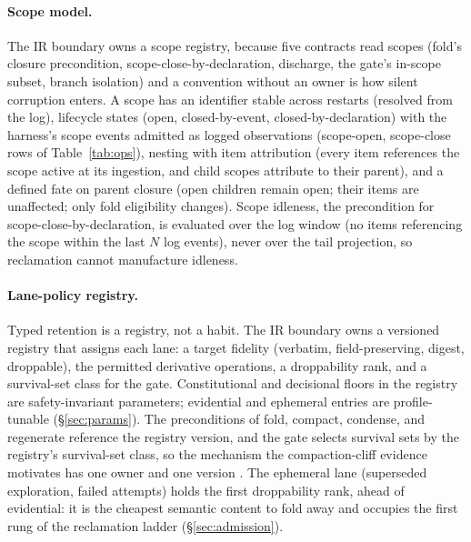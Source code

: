 \documentclass[11pt]{article}
\begin{document}
\paragraph{Scope model.} The IR boundary owns a scope registry, because five contracts read scopes (fold's closure precondition, scope-close-by-declaration, discharge, the gate's in-scope subset, branch isolation) and a convention without an owner is how silent corruption enters. A scope has an identifier stable across restarts (resolved from the log), lifecycle states (open, closed-by-event, closed-by-declaration) with the harness's scope events admitted as logged observations (scope-open, scope-close rows of Table~\ref{tab:ops}), nesting with item attribution (every item references the scope active at its ingestion, and child scopes attribute to their parent), and a defined fate on parent closure (open children remain open; their items are unaffected; only fold eligibility changes). Scope idleness, the precondition for scope-close-by-declaration, is evaluated over the log window (no items referencing the scope within the last $N$ log events), never over the tail projection, so reclamation cannot manufacture idleness.

\paragraph{Lane-policy registry.}
\label{sec:lanepolicy}
Typed retention is a registry, not a habit. The IR boundary owns a versioned registry that assigns each lane: a target fidelity (verbatim, field-preserving, digest, droppable), the permitted derivative operations, a droppability rank, and a survival-set class for the gate. Constitutional and decisional floors in the registry are safety-invariant parameters; evidential and ephemeral entries are profile-tunable (\S\ref{sec:params}). The preconditions of fold, compact, condense, and regenerate reference the registry version, and the gate selects survival sets by the registry's survival-set class, so the mechanism the compaction-cliff evidence motivates has one owner and one version \cite{cliff2026}. The ephemeral lane (superseded exploration, failed attempts) holds the first droppability rank, ahead of evidential: it is the cheapest semantic content to fold away and occupies the first rung of the reclamation ladder (\S\ref{sec:admission}).
\end{document}
